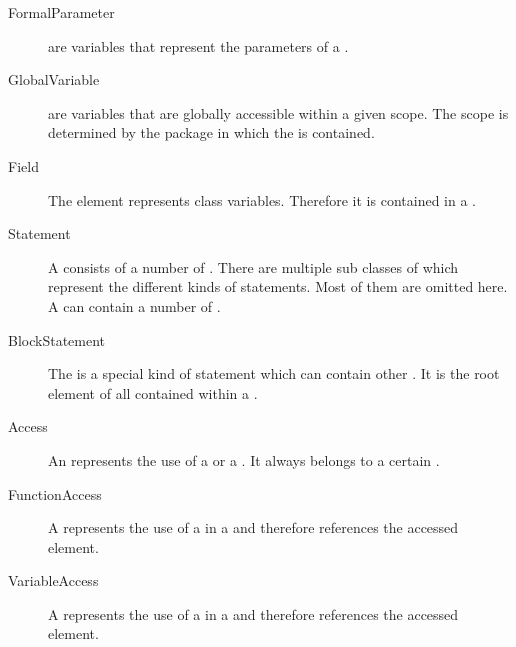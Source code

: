 \begin{description}
\item[FormalParameter]  are variables that represent the parameters of a .
\item[GlobalVariable]  are variables that are globally accessible within a given scope. The scope is determined by the package in which the  is contained.
\item[Field] The  element represents class variables. Therefore it is contained in a .
\item[Statement] A  consists of a number of . There are multiple sub classes of  which represent the different kinds of statements. Most of them are omitted here. A  can contain a number of .
\item[BlockStatement] The  is a special kind of statement which can contain other . It is the root element of all  contained within a .
\item[Access] An  represents the use of a  or a . It always belongs to a certain .
\item[FunctionAccess] A  represents the use of a  in a  and therefore references the accessed  element.
\item[VariableAccess] A  represents the use of a  in a  and therefore references the accessed  element.
\end{description}
